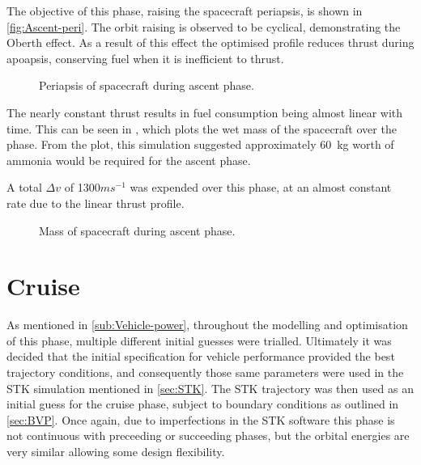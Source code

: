 The objective of this phase, raising the spacecraft periapsis, is shown in \autoref{fig:Ascent-peri}. The orbit raising is observed to be cyclical, demonstrating the Oberth effect. As a result of this effect the optimised profile reduces thrust during apoapsis, conserving fuel when it is inefficient to thrust.

\begin{figure}
\centering
\def\svgwidth{\figurewidth}

\caption{Periapsis of spacecraft during ascent phase.}
\label{fig:Ascent-peri}
\end{figure}

The nearly constant thrust results in fuel consumption being almost linear with time. This can be seen in \cite{fig:Ascent-mass}, which plots the wet mass of the spacecraft over the phase. From the plot, this simulation suggested approximately 60~kg worth of ammonia would be required for the ascent phase. %

A total $\Delta v$ of 1300$ms^{-1}$ was expended over this phase, at an almost constant rate due to the linear thrust profile. %

\begin{figure}
\centering
\def\svgwidth{\figurewidth}

\caption{Mass of spacecraft during ascent phase.}
\label{fig:Ascent-mass}
\end{figure}


\clearpage

\section{Cruise} \label{sec:Cruise}
As mentioned in \autoref{sub:Vehicle-power}, throughout the modelling and optimisation of this phase, multiple different initial guesses were trialled. Ultimately it was decided that the initial specification for vehicle performance provided the best trajectory conditions, and consequently those same parameters were used in the STK simulation mentioned in \autoref{sec:STK}. The STK trajectory was then used as an initial guess for the cruise phase, subject to boundary conditions as outlined in \autoref{sec:BVP}. Once again, due to imperfections in the STK software this phase is not continuous with preceeding or succeeding phases, but the orbital energies are very similar allowing some design flexibility.

